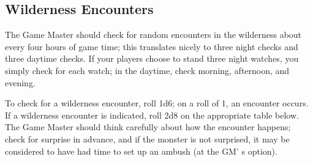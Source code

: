 \documentclass[a4paper,twoside,openany,10pt]{book}
\begin{document}
\subsection{Wilderness Encounters}\label{wilderness-encounters}

The Game Master should check for random encounters in the wilderness about every four hours of game time; this translates nicely to three night checks and three daytime checks. If your players choose to stand three night watches, you simply check for each watch; in the daytime, check morning, afternoon, and evening.

To check for a wilderness encounter, roll 1d6; on a roll of 1, an encounter occurs. If a wilderness encounter is indicated, roll 2d8 on the appropriate table below. The Game Master should think carefully about how the encounter happens; check for surprise in advance, and if the monster is not surprised, it may be considered to have had time to set up an ambush (at the GM' s option).\medskip
\end{document}
